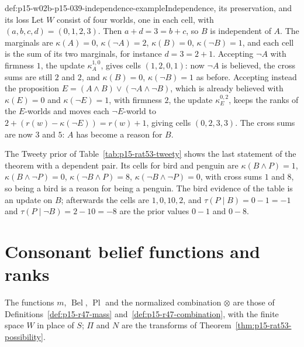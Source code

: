 \begin{hbexample}{def:p15-w02b-p15-039-independence-example}{Independence, its preservation, and its loss}
Let \(W\) consist of four worlds, one in each cell, with
\((a,b,c,d)=(0,1,2,3)\).  Then \(a+d=3=b+c\), so \(B\) is independent of
\(A\).  The marginals are \(\kappa(A)=0\), \(\kappa(\neg A)=2\),
\(\kappa(B)=0\), \(\kappa(\neg B)=1\), and each cell is the sum of its two
marginals, for instance \(d=3=2+1\).  Accepting \(\neg A\) with firmness
\(1\), the update \(\kappa^{1,0}_A\), gives cells \((1,2,0,1)\): now
\(\neg A\) is believed, the cross sums are still \(2\) and \(2\), and
\(\kappa(B)=0\), \(\kappa(\neg B)=1\) as before.  Accepting instead the
proposition \(E=(A\land B)\lor(\neg A\land\neg B)\), which is already
believed with \(\kappa(E)=0\) and \(\kappa(\neg E)=1\), with firmness \(2\),
the update \(\kappa^{0,2}_E\), keeps the ranks of the \(E\)-worlds and moves
each \(\neg E\)-world to \(2+(r(w)-\kappa(\neg E))=r(w)+1\), giving cells
\((0,2,3,3)\).  The cross sums are now \(3\) and \(5\): \(A\) has become a
reason for \(B\).

The Tweety prior of Table~\ref{tab:p15-rat53-tweety} shows the last
statement of the theorem with a dependent pair.  Its cells for bird and
penguin are \(\kappa(B\land P)=1\), \(\kappa(B\land\neg P)=0\),
\(\kappa(\neg B\land P)=8\), \(\kappa(\neg B\land\neg P)=0\), with cross sums
\(1\) and \(8\), so being a bird is a reason for being a penguin.  The bird
evidence of the table is an update on \(B\); afterwards the cells are
\(1,0,10,2\), and \(\tau(P\mid B)=0-1=-1\) and
\(\tau(P\mid\neg B)=2-10=-8\) are the prior values \(0-1\) and \(0-8\).
\end{hbexample}

\section{Consonant belief functions and ranks}
\label{sec:p15-w02b-p15-039-consonant}

The functions \(m\), \(\operatorname{Bel}\), \(\operatorname{Pl}\) and the
normalized combination \(\otimes\) are those of
Definitions~\ref{def:p15-r47-mass} and~\ref{def:p15-r47-combination}, with
the finite space \(W\) in place of \(S\); \(\Pi\) and \(N\) are the
transforms of Theorem~\ref{thm:p15-rat53-possibility}.

